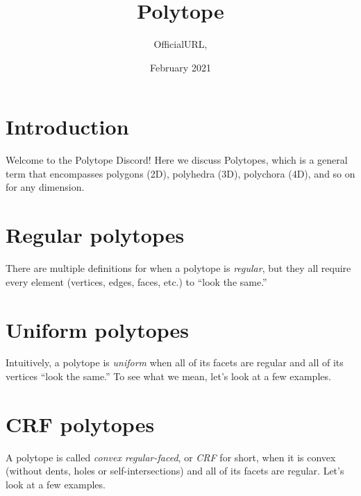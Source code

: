 \documentclass{article}
\title{Polytope}
\author{OfficialURL, }
\date{February 2021}
\begin{document}
\maketitle

\section{Introduction}
Welcome to the Polytope Discord! Here we discuss Polytopes, which is a general term that encompasses polygons (2D), polyhedra (3D), polychora (4D), and so on for any dimension.

\section{Regular polytopes}
There are multiple definitions for when a polytope is \textit{regular}, but they all require every element (vertices, edges, faces, etc.) to ``look the same.''

\section{Uniform polytopes}
Intuitively, a polytope is \textit{uniform} when all of its facets are regular and all of its vertices ``look the same.'' To see what we mean, let's look at a few examples.

\section{CRF polytopes}
A polytope is called \textit{convex regular-faced}, or \textit{CRF} for short, when it is convex (without dents, holes or self-intersections) and all of its facets are regular. Let's look at a few examples.
\end{document}
